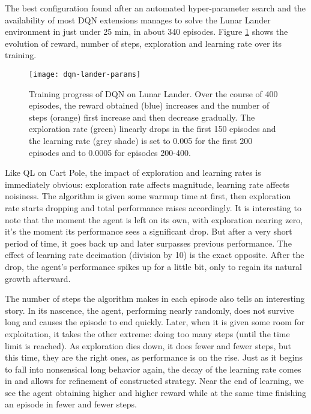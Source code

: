\documentclass{article}
\begin{document}
The best configuration found after an automated hyper-parameter search and the availability of most DQN extensions manages to solve the Lunar Lander environment in just under 25 min, in about 340 episodes. Figure \ref{fig:dqn-lander} shows the evolution of reward, number of steps, exploration and learning rate over its training.

 \begin{figure}[!h]
\centering
  \texttt{[image: dqn-lander-params]}
  \caption{Training progress of DQN on Lunar Lander. Over the course of 400 episodes, the reward obtained (blue) increases and the number of steps (orange) first increase and then decrease gradually. The exploration rate (green) linearly drops in the first 150 episodes and the learning rate (grey shade) is set to 0.005 for the first 200 episodes and to 0.0005 for episodes 200-400.}
  \label{fig:dqn-lander}
\end{figure}


Like QL on Cart Pole, the impact of exploration and learning rates is immediately obvious: exploration rate affects magnitude, learning rate affects noisiness. The algorithm is given some warmup time at first, then exploration rate starts dropping and total performance raises accordingly. It is interesting to note that the moment the agent is left on its own, with exploration nearing zero, it's the moment its performance sees a significant drop. But after a very short period of time, it goes back up and later surpasses previous performance. The effect of learning rate decimation (division by 10) is the exact opposite. After the drop, the agent's performance spikes up for a little bit, only to regain its natural growth afterward. 

The number of steps the algorithm makes in each episode also tells an interesting story. In its nascence, the agent, performing nearly randomly, does not survive long and causes the episode to end quickly. Later, when it is given some room for exploitation, it takes the other extreme: doing too many steps (until the time limit is reached). As exploration dies down, it does fewer and fewer steps, but this time, they are the right ones, as performance is on the rise. Just as it begins to fall into nonsensical long behavior again, the decay of the learning rate comes in and allows for refinement of constructed strategy. Near the end of learning, we see the agent obtaining higher and higher reward while at the same time finishing an episode in fewer and fewer steps.
   
\end{document}
